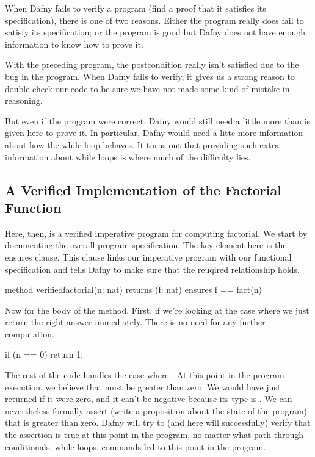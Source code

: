 \documentclass[letterpaper,10pt,english]{sphinxmanual}
\begin{document}
When Dafny fails to verify a program (find a proof that it satisfies
its specification), there is one of two reasons. Either the program
really does fail to satisfy its specification; or the program is good
but Dafny does not have enough information to know how to prove it.

With the preceding program, the postcondition really isn’t satisfied
due to the bug in the program. When Dafny fails to verify, it gives
us a strong reason to double-check our code to be sure we have not
made some kind of mistake in reasoning.

But even if the program were correct, Dafny would still need a little
more than is given here to prove it. In particular, Dafny would need a
litte more information about how the while loop behaves. It turns out
that providing such extra information about while loops is where much
of the difficulty lies.


\subsection{A Verified Implementation of the Factorial Function}
\label{\detokenize{05-verifying-logical-specifications:a-verified-implementation-of-the-factorial-function}}
Here, then, is a verified imperative program for computing
factorial. We start by documenting the overall program specification.
The key element here is the ensures clause. This clause links our
imperative program with our functional specification and tells Dafny
to make sure that the reuqired relationship holds.

\begin{sphinxVerbatim}[commandchars=\\\{\}]
method verified\PYGZus{}factorial(n: nat) returns (f: nat)
    ensures f == fact(n)
\end{sphinxVerbatim}

Now for the body of the method. First, if we’re looking at the case
where  we just return the right answer immediately. There is
no need for any further computation.

\begin{sphinxVerbatim}[commandchars=\\\{\}]
if (n == 0)
\PYGZob{}
    return 1;
\PYGZcb{}
\end{sphinxVerbatim}

The rest of the code handles the case where . At this point in
the program execution, we believe that  must be greater than zero.
We would have just returned if it were zero, and it can’t be negative
because its type is . We can nevertheless formally assert (write
a proposition about the state of the program) that  is greater than
zero. Dafny will try to (and here will successfully) verify that the
assertion is true at this point in the program, no matter what path
through conditionals, while loops, commands led to this point in the
program.
\end{document}
